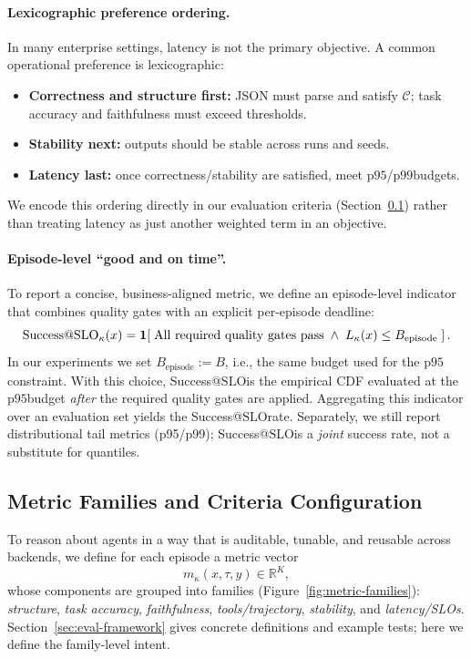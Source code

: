 \documentclass[11pt]{article}
\newcommand{\pninetyfive}{\ensuremath{\mathrm{p95}}}
\newcommand{\pninetynine}{\ensuremath{\mathrm{p99}}}
\newcommand{\slo}{\ensuremath{\mathrm{SLO}}}
\begin{document}
\paragraph{Lexicographic preference ordering.}
In many enterprise settings, latency is not the primary objective.
A common operational preference is lexicographic:
\begin{itemize}[leftmargin=12pt]
    \item \textbf{Correctness and structure first:} JSON must parse and satisfy $\mathcal{C}$; task accuracy and faithfulness must exceed thresholds.
    \item \textbf{Stability next:} outputs should be stable across runs and seeds.
    \item \textbf{Latency last:} once correctness/stability are satisfied, meet \pninetyfive/\pninetynine budgets.
\end{itemize}
We encode this ordering directly in our evaluation criteria (Section~\ref{sec:problem-metrics}) rather than treating latency as just another weighted term in an objective.

\paragraph{Episode-level ``good and on time''.}
To report a concise, business-aligned metric, we define an episode-level indicator that combines quality gates with an explicit per-episode deadline:
\[
\text{Success@\slo}_\kappa(x)=\mathbf{1}\!\left[\;\text{All required quality gates pass}\;\wedge\; L_\kappa(x)\le B_{\text{episode}}\;\right].
\]
In our experiments we set $B_{\text{episode}} := B$, i.e., the same budget used for the \pninetyfive constraint.
With this choice, Success@\slo is the empirical CDF evaluated at the \pninetyfive budget \emph{after} the required quality gates are applied.
Aggregating this indicator over an evaluation set yields the Success@\slo rate.
Separately, we still report distributional tail metrics (p95/p99); Success@\slo is a \emph{joint} success rate, not a substitute for quantiles.

\subsection{Metric Families and Criteria Configuration}
\label{sec:problem-metrics}

To reason about agents in a way that is auditable, tunable, and reusable across backends, we define for each episode a metric vector
\[
m_\kappa(x,\tau,y)\in\mathbb{R}^K,
\]
whose components are grouped into families (Figure~\ref{fig:metric-families}):
\emph{structure}, \emph{task accuracy}, \emph{faithfulness}, \emph{tools/trajectory}, \emph{stability}, and \emph{latency/SLOs}.
Section~\ref{sec:eval-framework} gives concrete definitions and example tests; here we define the family-level intent.
\end{document}
